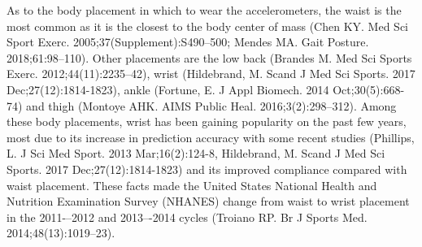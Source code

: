 \documentclass[11pt]{article}
\begin{document}
As to the body placement in which to wear the accelerometers, the waist is the most common as it is the closest to the body center of mass {\tiny (Chen KY. Med Sci Sport Exerc. 2005;37(Supplement):S490–500; Mendes MA. Gait Posture. 2018;61:98–110)}. Other placements are the low back {\tiny (Brandes M. Med Sci Sports Exerc. 2012;44(11):2235–42)}, wrist {\tiny (Hildebrand, M. Scand J Med Sci Sports. 2017 Dec;27(12):1814-1823)}, ankle {\tiny (Fortune, E. J Appl Biomech. 2014 Oct;30(5):668-74)} and thigh {\tiny (Montoye AHK. AIMS Public Heal. 2016;3(2):298–312)}. Among these body placements, wrist has been gaining popularity on the past few years, most due to its increase in prediction accuracy with  some recent studies {\tiny (Phillips, L. J Sci Med Sport. 2013 Mar;16(2):124-8, Hildebrand, M. Scand J Med Sci Sports. 2017 Dec;27(12):1814-1823)} and its improved compliance compared with waist placement. These facts made the United States National Health and Nutrition Examination Survey (NHANES) change from waist to wrist placement in the 2011-–2012 and 2013–-2014 cycles {\tiny (Troiano RP. Br J Sports Med. 2014;48(13):1019–23)}. \\
\end{document}
